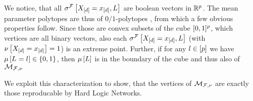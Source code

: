 We notice, that all $\sigma^{\mathcal{F}}\left[X_{[d]}=x_{[d]},L\right]$ are boolean vectors in $\mathbb{R}^{p}$.
The mean parameter polytopes are thus of $0/1$-polytopes \cite{ziegler_lectures_2000,gillmann_01-polytopes_2007}, from which a few obvious properties follow.
Since those are convex subsets of the cube $[0,1]^p$, which vertices are all binary vectors, also each $\sigma^{\mathcal{F}}\left[X_{[d]}=x_{[d]},L\right]$ (with $\nu\left[X_{[d]}=x_{[d]}\right]=1$) is an extreme point.
Further, if for any $l\in[p]$ we have $\mu\left[L_{}=l_{}\right]\in\{0,1\}$, then $\mu\left[L\right]$ is in the boundary of the cube and thus also of $\mathcal{M}_{\mathcal{F},\nu}$





We exploit this characterization to show, that the vertices of $\mathcal{M}_{\mathcal{F},\nu}$ are exactly those reproducable by Hard Logic Networks.

